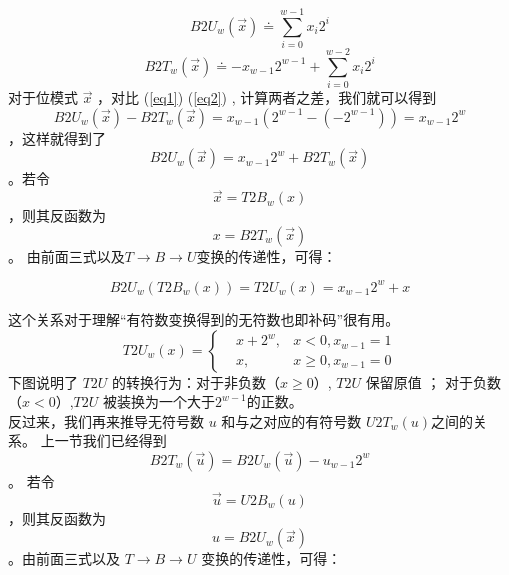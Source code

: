 \documentclass[11pt,a4paper]{article}
\begin{document}
    \begin{equation}
      B2U_w\left( \overrightarrow{x} \right) \doteq \sum_{i=0}^{w-1} x_i 2^i \label{eq1}
    \end{equation}
    \begin{equation}
      B2T_w\left( \overrightarrow{x} \right) \doteq -x_{w-1} 2^{w-1} + \sum_{i=0}^{w-2} x_i 2^i \label{eq2}
    \end{equation}
    对于位模式 $\overrightarrow{x}$ ，对比 (\ref{eq1}) (\ref{eq2}) , 计算两者之差，我们就可以得到
   $$ B2U_w\left( \overrightarrow{x} \right) - B2T_w\left( \overrightarrow{x} \right) = x_{w-1}  \left( 2^{w-1} - \left( -2^{w-1} \right) \right)  =  x_{w-1} 2^w $$ ，这样就得到了 $$B2U_w\left( \overrightarrow{x} \right) = x_{w-1} 2^w + B2T_w\left( \overrightarrow{x} \right)$$ 。若令 $$\overrightarrow{x} = T2B_w \left( x \right) $$ ，则其反函数为 $$ x = B2T_w \left( \overrightarrow{x} \right) $$ 。 由前面三式以及$T \rightarrow B \rightarrow U$变换的传递性，可得：

    \begin{equation}
      B2U_w\left( T2B_w \left( x \right) \right) = T2U_w \left( x \right) = x_{w-1} 2^w + x
    \end{equation}

    这个关系对于理解“有符数变换得到的无符数也即补码”很有用。
    \begin{equation}
       T2U_w \left( x \right)=\left\{
        \begin{aligned}
          & x+2^w, & x<0,x_{w-1}=1  \\
          & x, & x \geq 0,x_{w-1}=0
        \end{aligned}
        \right.
    \end{equation}
    下图说明了 $T2U$ 的转换行为：对于非负数（$x \geq 0$）, $T2U$ 保留原值 ； 对于负数（$x<0$）,$T2U$ 被装换为一个大于$2^{w-1}$的正数。\\
    反过来，我们再来推导无符号数 $u$ 和与之对应的有符号数 $U2T_w \left( u \right) $之间的关系。
上一节我们已经得到 $$B2T_w\left( \overrightarrow{u} \right) = B2U_w\left( \overrightarrow{u} \right) - u_{w-1} 2^w $$ 。 若令 $$\overrightarrow{u} = U2B_w \left( u \right) $$ ，则其反函数为 $$ u = B2U_w \left( \overrightarrow{x} \right) $$ 。由前面三式以及 $T \rightarrow B \rightarrow U$ 变换的传递性，可得：
\end{document}
